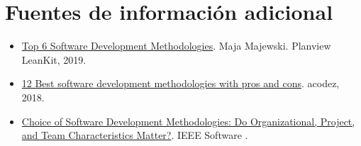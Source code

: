 \section*{Fuentes de información adicional}
\begin{itemize}[nosep]
\item \href{https://leankit.com/blog/2019/03/top-6-software-development-methodologies/}{Top
  6 Software Development Methodologies}. Maja Majewski. Planview
  LeanKit, 2019.
\item \href{https://acodez.in/12-best-software-development-methodologies-pros-cons/}{12
  Best software development methodologies with pros and cons}. acodez,
  2018.
\item \href{https://www.computer.org/csdl/magazine/so/2016/05/mso2016050086/13rRUwh80B3}{Choice of Software Development Methodologies: Do Organizational, Project, and Team Characteristics Matter?}. IEEE Software \cite{Vijayasarathy_2016}.
\end{itemize}
